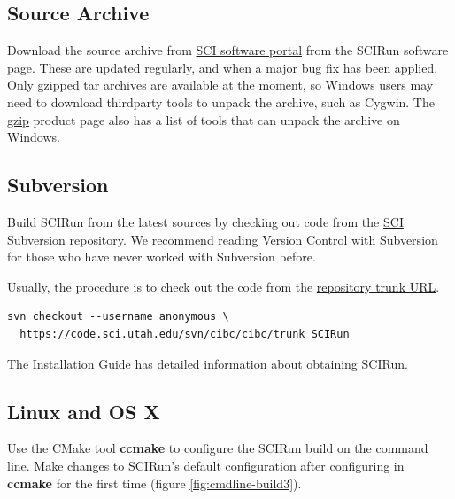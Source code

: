 \documentclass[fleqn,12pt,openany]{book}
\begin{document}
\subsection{Source Archive}

Download the source archive from
\href{http://software.sci.utah.edu}{SCI software portal} from the SCIRun software page.
These are updated regularly, and when a major bug fix has been applied.
Only gzipped tar archives are available at the moment, so Windows users may need to download
thirdparty tools to unpack the archive, such as Cygwin.
The \href{http://www.gzip.org/}{gzip} product page also has a list of tools that can unpack the
archive on Windows.

\subsection{Subversion}

Build SCIRun from the latest sources by checking out code from the
\href{https://code.sci.utah.edu}{SCI Subversion repository}.
We recommend reading \href{http://svnbook.red-bean.com/}{Version Control with Subversion}
for those who have never worked with Subversion before.


Usually, the procedure is to check out the code from the
\href{https://code.sci.utah.edu/svn/cibc/cibc/trunk}{repository trunk URL}.

\begin{verbatim}
svn checkout --username anonymous \
  https://code.sci.utah.edu/svn/cibc/cibc/trunk SCIRun
\end{verbatim}

The Installation Guide has detailed information about obtaining SCIRun.

\subsection{Linux and OS X}

Use the CMake tool \textbf{ccmake} to configure the SCIRun build on
the command line.
Make changes to SCIRun's default configuration after configuring
in \textbf{ccmake} for the first time (figure \ref{fig:cmdline-build3}).
\end{document}
